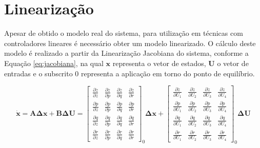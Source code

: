\documentclass[main.tex]{subfiles}
\begin{document}
\vspace{0.2cm}

\section{Linearização}

Apesar de obtido o modelo real do sistema, para utilização em técnicas com controladores lineares é necessário obter um modelo linearizado. O cálculo deste modelo é realizado a partir da Linearização Jacobiana \cite{jacobiana} do sistema, conforme a Equação \ref{eq:jacobiana}, na qual $\boldsymbol{x}$ representa o vetor de estados, $\boldsymbol{U}$ o vetor de entradas e o subscrito $0$ representa a aplicação em torno do ponto de equilíbrio.

\vspace{0.1cm}

\begin{equation}\label{eq:jacobiana}
	\boldsymbol{\dot{x}} = \boldsymbol{A\Delta x} + \boldsymbol{B\Delta U} = \begin{bmatrix}
		\frac{\partial \ddot{z}}{\partial z} & \frac{\partial \ddot{z}}{\partial p} & \frac{\partial \ddot{z}}{\partial q} & \frac{\partial \ddot{z}}{\partial r}\\
		
		\frac{\partial \dot{p}}{\partial z} & \frac{\partial \dot{p}}{\partial p} & \frac{\partial \dot{p}}{\partial q} & \frac{\partial \dot{p}}{\partial r}\\
		
		\frac{\partial \dot{q}}{\partial z} & \frac{\partial \dot{q}}{\partial p} & \frac{\partial \dot{q}}{\partial q} & \frac{\partial \dot{q}}{\partial r}\\
		
		\frac{\partial \dot{r}}{\partial z} & \frac{\partial \dot{r}}{\partial p} & \frac{\partial \dot{r}}{\partial q} & \frac{\partial \dot{r}}{\partial r}
	\end{bmatrix}_{0}\boldsymbol{\Delta x} + \begin{bmatrix}
		\frac{\partial \ddot{z}}{\partial U_1} & \frac{\partial \ddot{z}}{\partial U_2} & \frac{\partial \ddot{z}}{\partial U_3} & \frac{\partial \ddot{z}}{\partial U_4}\\
		
		\frac{\partial \dot{p}}{\partial U_1} & \frac{\partial \dot{p}}{\partial U_2} & \frac{\partial \dot{p}}{\partial U_3} & \frac{\partial \dot{p}}{\partial U_4}\\
		
		\frac{\partial \dot{q}}{\partial U_1} & \frac{\partial \dot{q}}{\partial U_2} & \frac{\partial \dot{q}}{\partial U_3} & \frac{\partial \dot{q}}{\partial U_4}\\
		
		\frac{\partial \dot{r}}{\partial U_1} & \frac{\partial \dot{r}}{\partial U_2} & \frac{\partial \dot{r}}{\partial U_3} & \frac{\partial \dot{r}}{\partial U_4}
	\end{bmatrix}_{0}\boldsymbol{\Delta U}
\end{equation}
\end{document}

